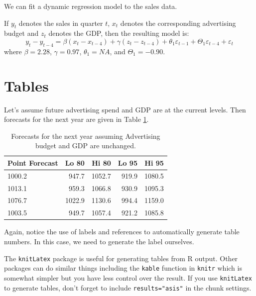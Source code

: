 \documentclass{monashthesis}
\begin{document}
We can fit a dynamic regression model to the sales data.

If \(y_t\) denotes the sales in quarter \(t\), \(x_t\) denotes the corresponding advertising budget and \(z_t\) denotes the GDP, then the resulting model is:
\begin{equation}
  y_t - y_{t-4} = \beta (x_t-x_{t-4}) + \gamma (z_t-z_{t-4}) + \theta_1 \varepsilon_{t-1} + \Theta_1 \varepsilon_{t-4} + \varepsilon_t
\end{equation}
where
\(\beta = 2.28\),
\(\gamma = 0.97\),
\(\theta_1 = NA\),
and
\(\Theta_1 = -0.90\).

\hypertarget{tables}{%
\section{Tables}\label{tables}}

Let's assume future advertising spend and GDP are at the current levels. Then forecasts for the next year are given in Table \ref{tab:salesforecasts}.

\begin{table}[ht]
\begin{center}
\begin{tabular}{lrrrr}
\toprule
Point Forecast & Lo 80 & Hi 80 & Lo 95 & Hi 95 \\
\midrule
1000.2 &  947.7 & 1052.7 & 919.9 & 1080.5 \\
1013.1 &  959.3 & 1066.8 & 930.9 & 1095.3 \\
1076.7 & 1022.9 & 1130.6 & 994.4 & 1159.0 \\
1003.5 &  949.7 & 1057.4 & 921.2 & 1085.8 \\
\bottomrule
\end{tabular}
\caption{Forecasts for the next year assuming Advertising budget and GDP are unchanged.}
\label{tab:salesforecasts}
\end{center}
\end{table}

Again, notice the use of labels and references to automatically generate table numbers. In this case, we need to generate the label ourselves.

The \texttt{knitLatex} package is useful for generating tables from R output. Other packages can do similar things including the \texttt{kable} function in \texttt{knitr} which is somewhat simpler but you have less control over the result. If you use \texttt{knitLatex} to generate tables, don't forget to include \texttt{results="asis"} in the chunk settings.
\end{document}
